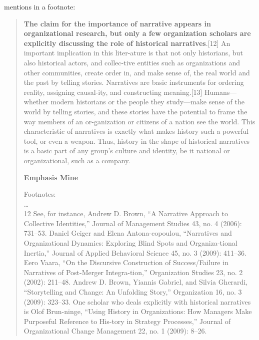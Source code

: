 \citet[pp.696--7]{hansen2012business} mentions \citet{geiger2009narratives} in a footnote:\\
\begin{quote}
{\bf The claim for the importance of narrative appears in organizational research, but only a few organization scholars are explicitly discussing the role of historical narratives}.[12] An important implication in this liter-ature  is  that  not  only  historians,  but  also  historical  actors,  and  collec-tive entities such as organizations and other communities, create order in,  and  make  sense  of,  the  real  world  and  the  past  by  telling  stories.  Narratives are basic instruments for ordering reality, assigning causal-ity, and constructing meaning.[13] Humans—whether modern historians or  the  people  they  study—make  sense  of  the  world  by  telling  stories,  and these stories have the potential to frame the way members of an or-ganization  or  citizens  of  a  nation  see  the  world.  This  characteristic  of  narratives is exactly what makes history such a powerful tool, or even a weapon.  Thus,  history  in  the  shape  of  historical  narratives  is  a  basic  part of any group’s culture and identity, be it national or organizational, such as a company.\\
\begin{flushright}
{\bf Emphasis Mine} \\
\end{flushright}

Footnotes:\\

\ldots \\
12  See,  for  instance,  Andrew  D.  Brown,  “A  Narrative  Approach  to  Collective  Identities,”  Journal of Management Studies 43, no. 4 (2006): 731–53. Daniel Geiger and Elena Antona-copoulou,  “Narratives  and  Organizational  Dynamics:  Exploring  Blind  Spots  and  Organiza-tional Inertia,” Journal of Applied Behavioral Science 45, no. 3 (2009): 411–36. Eero Vaara, “On  the  Discursive  Construction  of  Success/Failure  in  Narratives  of  Post-Merger  Integra-tion,” Organization  Studies  23,  no.  2  (2002):  211–48.  Andrew  D.  Brown,  Yiannis  Gabriel,  and Silvia Gherardi, “Storytelling and Change: An Unfolding Story,” Organization 16, no. 3 (2009):  323–33.  One  scholar  who  deals  explicitly  with  historical  narratives  is  Olof  Brun-ninge, “Using History in Organizations: How Managers Make Purposeful Reference to His-tory  in  Strategy  Processes,”  Journal  of  Organizational  Change  Management  22,  no.  1  (2009): 8–26.\\
\end{quote}

